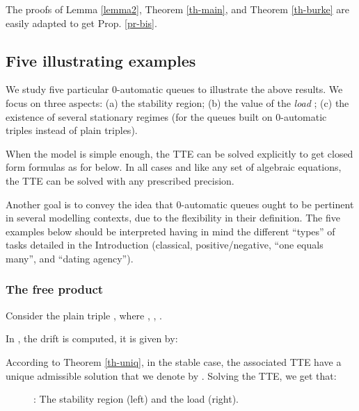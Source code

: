 \documentclass[11pt,a4paper]{article}
\theoremstyle{remark}
\begin{document}
The proofs of Lemma \ref{lemma2}, Theorem \ref{th-main}, and Theorem
\ref{th-burke} are easily
adapted to get Prop. \ref{pr-bis}.


\subsection{Five illustrating examples}\label{sse-5}

We study five particular 0-automatic queues to illustrate the
above results. We focus on three aspects: (a) the stability
region; (b) the value of the {\em load} ; (c) the existence
of several stationary regimes (for the queues built on 0-automatic
triples instead of plain triples). 

When the model is simple enough,
the TTE can be solved explicitly 
to get closed form formulas as for   below.
In all cases and like any set of algebraic equations, the TTE can
be solved with any prescribed precision.

\medskip

Another goal is to convey the
idea that 0-automatic queues ought to be pertinent in several
modelling contexts, due to the flexibility in their definition.
The five examples below should be interpreted having in mind the 
different ``types'' of tasks detailed in the Introduction (classical,
positive/negative, ``one equals many'', and ``dating agency''). 













\subsubsection{The free product } 

Consider the plain triple , where ,
, .

In \cite[Section 4.2]{MaMa}, the drift is computed, it is given
by:


According to Theorem \ref{th-uniq}, in the stable case, the associated TTE have a
unique admissible solution that we denote by . Solving
the TTE, we get that:


\begin{figure}[ht]

\caption{: The stability region (left) and the
  load  (right).} \label{f-z3-z3}
\end{figure}
\end{document}
